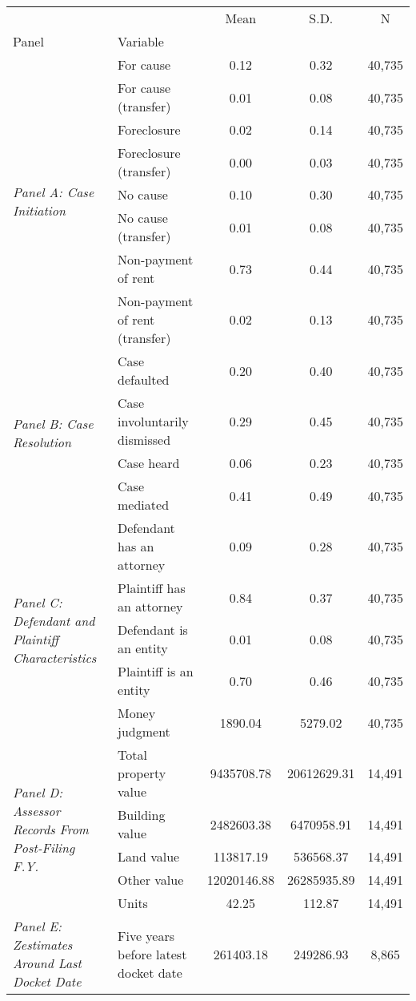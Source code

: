 \begin{tabular}{llccc}
\toprule
 &  & Mean & S.D. & N \\
Panel & Variable &  &  &  \\
\midrule
\multirow[c]{8}{4cm}{\textit{Panel A: Case Initiation}} & For cause & 0.12 & 0.32 & 40,735 \\
 & For cause (transfer) & 0.01 & 0.08 & 40,735 \\
 & Foreclosure & 0.02 & 0.14 & 40,735 \\
 & Foreclosure (transfer) & 0.00 & 0.03 & 40,735 \\
 & No cause & 0.10 & 0.30 & 40,735 \\
 & No cause (transfer) & 0.01 & 0.08 & 40,735 \\
 & Non-payment of rent & 0.73 & 0.44 & 40,735 \\
 & Non-payment of rent (transfer) & 0.02 & 0.13 & 40,735 \\
\cline{1-5}
\multirow[c]{4}{4cm}{\textit{Panel B: Case Resolution}} & Case defaulted & 0.20 & 0.40 & 40,735 \\
 & Case involuntarily dismissed & 0.29 & 0.45 & 40,735 \\
 & Case heard & 0.06 & 0.23 & 40,735 \\
 & Case mediated & 0.41 & 0.49 & 40,735 \\
\cline{1-5}
\multirow[c]{5}{4cm}{\textit{Panel C: Defendant and Plaintiff Characteristics}} & Defendant has an attorney & 0.09 & 0.28 & 40,735 \\
 & Plaintiff has an attorney & 0.84 & 0.37 & 40,735 \\
 & Defendant is an entity & 0.01 & 0.08 & 40,735 \\
 & Plaintiff is an entity & 0.70 & 0.46 & 40,735 \\
 & Money judgment & 1890.04 & 5279.02 & 40,735 \\
\cline{1-5}
\multirow[c]{5}{4cm}{\textit{Panel D: Assessor Records From Post-Filing F.Y.}} & Total property value & 9435708.78 & 20612629.31 & 14,491 \\
 & Building value & 2482603.38 & 6470958.91 & 14,491 \\
 & Land value & 113817.19 & 536568.37 & 14,491 \\
 & Other value & 12020146.88 & 26285935.89 & 14,491 \\
 & Units & 42.25 & 112.87 & 14,491 \\
\cline{1-5}
\multirow[c]{9}{4cm}{\textit{Panel E: Zestimates Around Last Docket Date}} & Five years before latest docket date & 261403.18 & 249286.93 & 8,865 \\

\end{tabular}
